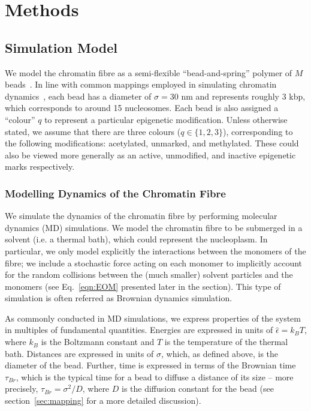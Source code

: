 \documentclass[12pt]{article}
\begin{document}
\section{Methods}
\subsection{Simulation Model}
We model the chromatin fibre as a semi-flexible ``bead-and-spring'' polymer of $M$ beads~\cite{kremer1990}. In line with common mappings employed in simulating chromatin dynamics~\cite{rosa2008, mirny2011, brackley2016, michieletto2016}, each bead has a diameter of $\sigma = 30$ nm and represents roughly 3 kbp, which corresponds to around 15 nucleosomes. Each bead is also assigned a ``colour'' $q$ to represent a particular epigenetic modification. Unless otherwise stated, we assume that there are three colours ($q \in \{1, 2, 3\}$), corresponding to the following modifications: acetylated, unmarked, and methylated. These could also be viewed more generally as an active, unmodified, and inactive epigenetic marks respectively.

\subsubsection{Modelling Dynamics of the Chromatin Fibre}
We simulate the dynamics of the chromatin fibre by performing molecular dynamics (MD) simulations. We model the chromatin fibre to be submerged in a solvent (i.e. a thermal bath), which could represent the nucleoplasm. In particular, we only model explicitly the interactions between the monomers of the fibre; we include a stochastic force acting on each monomer to implicitly account for the random collisions between the (much smaller) solvent particles and the monomers (see Eq.~\ref{eqn:EOM} presented later in the section). This type of simulation is often referred as Brownian dynamics simulation.

As commonly conducted in MD simulations, we express properties of the system in multiples of fundamental quantities. Energies are expressed in units of  $\hat{\epsilon} = k_BT$, where $k_B$ is the Boltzmann constant and $T$ is the temperature of the thermal bath. Distances are expressed in units of $\sigma$, which, as defined above, is the diameter of the bead. Further, time is expressed in terms of the Brownian time $\tau_{Br}$, which is the typical time for a bead to diffuse a distance of its size -- more precisely, $\tau_{Br} = \sigma^2/D$, where $D$ is the diffusion constant for the bead (see section~\ref{sec:mapping} for a more detailed discussion).
\end{document}
